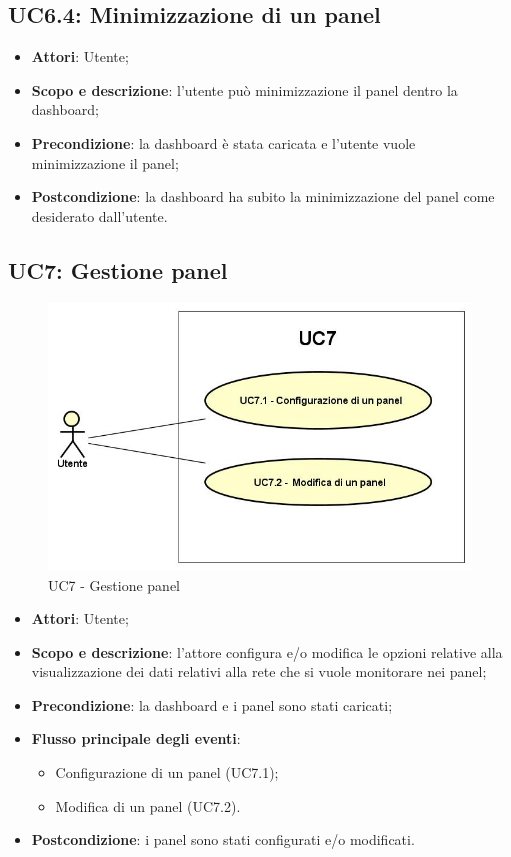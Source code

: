 \subsection{UC6.4: Minimizzazione di un panel}
\hypertarget{UC6.4}{}
\begin{itemize}
	\item \textbf{Attori}: Utente;
	\item \textbf{Scopo e descrizione}: l'utente può minimizzazione il panel dentro la dashboard;
	\item \textbf{Precondizione}: la dashboard è stata caricata e l'utente vuole minimizzazione il panel;
	\item \textbf{Postcondizione}: la dashboard ha subito la minimizzazione del panel come desiderato dall'utente.
\end{itemize}
\subsection{UC7: Gestione panel}
\hypertarget{UC7}{}
\begin{figure} [H]
	\centering
	\includegraphics[scale=0.45]{Img/UC7}
	\caption{UC7 - Gestione panel}\label{}
\end{figure}
\begin{itemize}
	\item \textbf{Attori}: Utente;
	\item \textbf{Scopo e descrizione}: l'attore configura e/o modifica le opzioni relative alla visualizzazione dei dati relativi alla rete che si vuole monitorare nei panel;
	\item \textbf{Precondizione}: la dashboard e i panel sono stati caricati;
	\item \textbf{Flusso principale degli eventi}:
	\begin{itemize}
		\item Configurazione di un panel (UC7.1);
		\item Modifica di un panel (UC7.2).
	\end{itemize}
	\item \textbf{Postcondizione}: i panel sono stati configurati e/o modificati.
\end{itemize}
